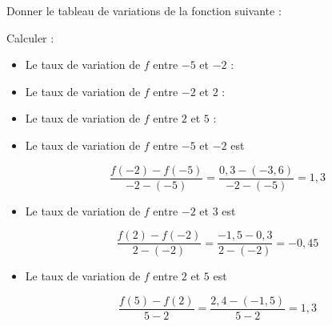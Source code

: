 \documentclass{beamer}
\begin{document}
\begin{frame}
	Donner le tableau de variations de la fonction suivante :
	\begin{center}
		\Graphique[scale=0.9]
	\end{center}
\end{frame}

\begin{frame}
	\begin{center}
	\end{center}
\end{frame}

\begin{frame}
	\begin{center}
		\Graphique[scale=0.7]
	\end{center}

	Calculer :
	\begin{itemize}
		\item Le taux de variation de $f$ entre $-5$ et $-2$ : \vspace{0.5em}
		\item Le taux de variation de $f$ entre $-2$ et $2$ : \vspace{0.5em}
		\item Le taux de variation de $f$ entre $2$ et $5$ : 
	\end{itemize}
\end{frame}

\begin{frame}
	\begin{itemize}
		\item Le taux de variation de $f$ entre $-5$ et $-2$ est

		      $$ \dfrac{f(-2) - f(-5)}{-2 - (-5)} = \dfrac{0,3 - (-3,6)}{-2 - (-5)} = 1,3 $$
		\item Le taux de variation de $f$ entre $-2$ et $3$ est

		      $$ \dfrac{f(2) - f(-2)}{2 - (-2)} = \dfrac{-1,5 - 0,3}{2 - (-2)} = -0,45 $$
		\item Le taux de variation de $f$ entre $2$ et $5$ est

		      $$ \dfrac{f(5) - f(2)}{5 - 2} = \dfrac{2,4 - (-1,5)}{5 - 2} = 1,3 $$
	\end{itemize}
\end{frame}
\end{document}
